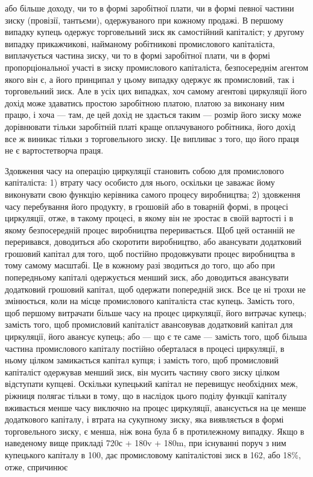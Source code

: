 або більше доходу, чи то в формі заробітної плати, чи в формі
певної частини зиску (провізії, тантьєми), одержуваного при
кожному продажі. В першому випадку купець одержує торговельний
зиск як самостійний капіталіст; у другому випадку прикажчикові,
найманому робітникові промислового капіталіста, виплачується
частина зиску, чи то в формі заробітної плати, чи
в формі пропорціональної участі в зиску промислового капіталіста,
безпосереднім агентом якого він є, а його принципал
у цьому випадку одержує як промисловий, так і торговельний
зиск. Але в усіх цих випадках, хоч самому агентові циркуляції
його дохід може здаватись простою заробітною платою, платою
за виконану ним працю, і хоча — там, де цей дохід не здається
таким — розмір його зиску може дорівнювати тільки заробітній
платі краще оплачуваного робітника, його дохід все ж виникає
тільки з торговельного зиску. Це випливає з того, що його
праця не є вартостетворча праця.

Здовження часу на операцію циркуляції становить собою
для промислового капіталіста: 1) втрату часу особисто для нього,
оскільки це заважає йому виконувати свою функцію керівника
самого процесу виробництва; 2) здовження часу перебування
його продукту, в грошовій або в товарній формі, в процесі циркуляції,
отже, в такому процесі, в якому він не зростає в своїй
вартості і в якому безпосередній процес виробництва переривається.
Щоб цей останній не переривався, доводиться або
скоротити виробництво, або авансувати додатковий грошовий
капітал для того, щоб постійно продовжувати процес виробництва
в тому самому масштабі. Це в кожному разі зводиться
до того, що або при попередньому капіталі одержується менший
зиск, або доводиться авансувати додатковий грошовий
капітал, щоб одержати попередній зиск. Все це ні трохи не
змінюється, коли на місце промислового капіталіста стає купець.
Замість того, щоб першому витрачати більше часу на процес
циркуляції, його витрачає купець; замість того, щоб промисловий
капіталіст авансовував додатковий капітал для циркуляції,
його авансує купець; або — що є те саме — замість того,
щоб більша частина промислового капіталу постійно оберталася
в процесі циркуляції, в ньому цілком замикається капітал
купця; і замість того, щоб промисловий капіталіст одержував
менший зиск, він мусить частину свого зиску цілком відступати
купцеві. Оскільки купецький капітал не перевищує необхідних
меж, ріжниця полягає тільки в тому, що в наслідок
цього поділу функції капіталу вживається менше часу виключно
на процес циркуляції, авансується на це менше додаткового
капіталу, і втрата на сукупному зиску, яка виявляється в формі
торговельного зиску, є менша, ніж вона була б в протилежному
випадку. Якщо в наведеному вище прикладі 720с + 180v + 180m,
при існуванні поруч з ним купецького капіталу в 100, дає промисловому
капіталістові зиск в 162, або 18\%, отже, спричинює

